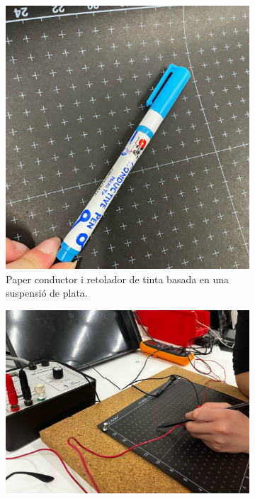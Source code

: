 \documentclass[a4paper,10.5pt]{report}
\begin{document}
	\begin{figure}[h]
		\centering
		\begin{subfigure}{0.45\textwidth}
			\centering
			\includegraphics[width=\linewidth]{screenshot002}
			\caption{Paper conductor i retolador de tinta basada en una suspensió de plata.}
			\label{fig1.1a}
		\end{subfigure}
		\hfill
		\begin{subfigure}{0.45\textwidth}
			\centering
			\includegraphics[width=\linewidth]{screenshot003}

\end{subfigure}
\end{figure}
\end{document}
